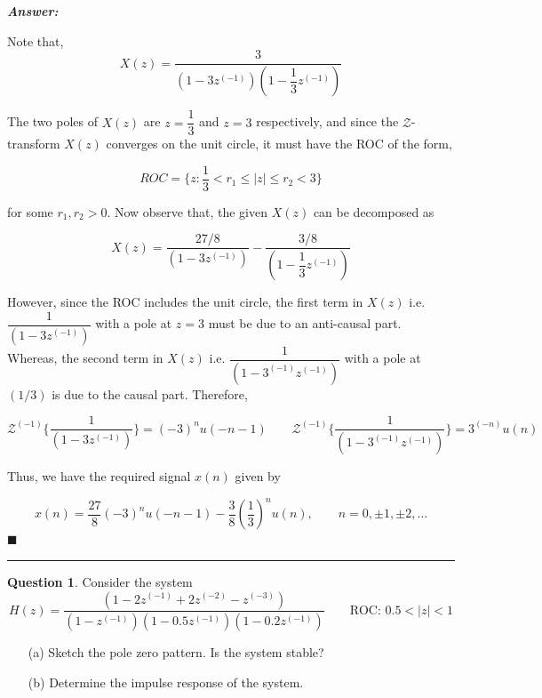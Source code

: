 \documentclass[12pt]{article}
\theoremstyle{definition}
\newtheorem{question}{Question}
\newenvironment{answer}{
    \textbf{\textit{Answer:}} \qquad
}{\hfill $\blacksquare$ \\ 

\begin{center}
    \rule{0.8\linewidth}{1.5px} 
    \vspace*{1cm}   
\end{center}
}
\newcommand{\zcal}{\mathcal{Z}}
\newcommand{\inv}[1][1]{^{(- #1)}}
\begin{document}
\begin{answer}
    Note that,
    $$
    X(z) = \dfrac{3}{(1 - 3z\inv)\left(1 - \dfrac{1}{3}z\inv \right)}
    $$

    The two poles of $X(z)$ are $z = \dfrac{1}{3}$ and $z = 3$ respectively, and since the $\zcal$-transform $X(z)$ converges on the unit circle, it must have the ROC of the form, 

    $$
    ROC = \{ z : \dfrac{1}{3} < r_1 \leq \vert z \vert \leq r_2 < 3 \}
    $$

    for some $r_1, r_2 > 0$. Now observe that, the given $X(z)$ can be decomposed as

    $$
    X(z) = \dfrac{27/8}{(1 - 3z\inv)} - \dfrac{3/8}{\left( 1 - \dfrac{1}{3} z\inv \right)}
    $$

    However, since the ROC includes the unit circle, the first term in $X(z)$ i.e. $\dfrac{1}{(1 - 3z\inv)}$ with a pole at $z = 3$ must be due to an anti-causal part. Whereas, the second term in $X(z)$ i.e. $\dfrac{1}{(1 -3\inv z\inv)}$ with a pole at $(1/3)$ is due to the causal part. Therefore,

    $$
    \zcal\inv\{ \dfrac{1}{(1 - 3z\inv)} \} = (-3)^n u(-n-1) \qquad 
    \zcal\inv\{ \dfrac{1}{(1 - 3\inv z\inv)} \} = 3\inv[n] u(n)
    $$

    Thus, we have the required signal $x(n)$ given by 

    $$
    x(n) = \dfrac{27}{8} (-3)^n u(-n-1) - \dfrac{3}{8} \left(\dfrac{1}{3}\right)^n u(n), \qquad n = 0, \pm 1, \pm 2, \dots 
    $$
\end{answer}


\begin{question}
    Consider the system 
    $$
    H(z) = \dfrac{(1 - 2z^{(-1)} + 2z^{(-2)} - z^{(-3)})}{(1 - z^{(-1)})(1 - 0.5 z^{(-1)})(1 - 0.2z^{(-1)}) } \qquad \text{ROC: } 0.5 < \vert z \vert < 1
    $$
    \begin{enumerate}
        \item[(a)] Sketch the pole zero pattern. Is the system stable?
        \item[(b)] Determine the impulse response of the system.
    \end{enumerate}
\end{question}
\end{document}

